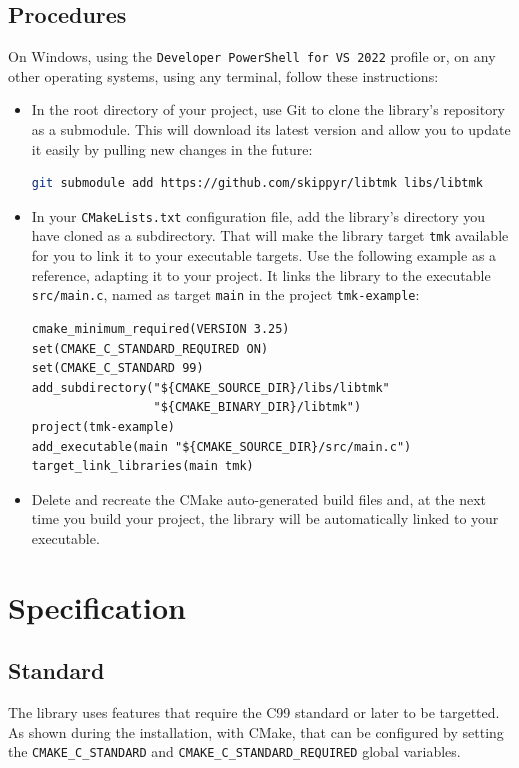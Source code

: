 \documentclass{report}
\begin{document}
\section{Procedures}
On Windows, using the \texttt{Developer PowerShell for VS 2022} profile or, on any other operating systems, using any terminal, follow these instructions:
\begin{itemize}
  \item In the root directory of your project, use Git to clone the library's repository as a submodule. This will download its latest version and allow you to update it easily by pulling new changes in the future:
  \begin{lstlisting}[language=sh,caption=a command to clone the library's repository as a submodule.]
git submodule add https://github.com/skippyr/libtmk libs/libtmk
  \end{lstlisting}
  \item In your \texttt{CMakeLists.txt} configuration file, add the library's directory you have cloned as a subdirectory. That will make the library target \texttt{tmk} available for you to link it to your executable targets.
  Use the following example as a reference, adapting it to your project. It links the library to the executable \texttt{src/main.c}, named as target \texttt{main} in the project \texttt{tmk-example}:
  \begin{lstlisting}[caption=a \texttt{CMakeLists.txt} example that links the library to an executable.]
cmake_minimum_required(VERSION 3.25)
set(CMAKE_C_STANDARD_REQUIRED ON)
set(CMAKE_C_STANDARD 99)
add_subdirectory("${CMAKE_SOURCE_DIR}/libs/libtmk"
                 "${CMAKE_BINARY_DIR}/libtmk")
project(tmk-example)
add_executable(main "${CMAKE_SOURCE_DIR}/src/main.c")
target_link_libraries(main tmk)
  \end{lstlisting}
  \item Delete and recreate the CMake auto-generated build files and, at the next time you build your project, the library will be automatically linked to your executable.
\end{itemize}
\chapter{Specification}
\section{Standard}
The library uses features that require the C99 standard or later to be targetted. As shown during the installation, with CMake, that can be configured by setting the \texttt{CMAKE\_C\_STANDARD} and \texttt{CMAKE\_C\_STANDARD\_REQUIRED} global variables.
\end{document}
